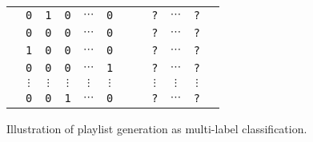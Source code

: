 \begin{figure}[!h]
\centering
{}  %
\setlength{\tabcolsep}{1pt} %
\begin{tabular}{|*{7}{c}|aaaaa|} \hline
\rule{0em}{10pt}
& \texttt{0} & \texttt{1} & \texttt{0} & $\cdots$ & \texttt{0} & & & \texttt{?} & $\cdots$ & \texttt{?} & \\
& \texttt{0} & \texttt{0} & \texttt{0} & $\cdots$ & \texttt{0} & & & \texttt{?} & $\cdots$ & \texttt{?} & \\
& \texttt{1} & \texttt{0} & \texttt{0} & $\cdots$ & \texttt{0} & & & \texttt{?} & $\cdots$ & \texttt{?} & \\
\vspace{-3pt}
& \texttt{0} & \texttt{0} & \texttt{0} & $\cdots$ & \texttt{1} & & & \texttt{?} & $\cdots$ & \texttt{?} & \\
& $\vdots$ & $\vdots$ & $\vdots$ & $\vdots$ & $\vdots$ & & & $\vdots$ & $\vdots$ & $\vdots$ & \\
& \texttt{0} & \texttt{0} & \texttt{1} & $\cdots$ & \texttt{0} & & & \texttt{?} & $\cdots$ & \texttt{?} & \\ \hline
\end{tabular}
\caption{Illustration of playlist generation as multi-label classification.}
\label{fig:pla}
\end{figure}
